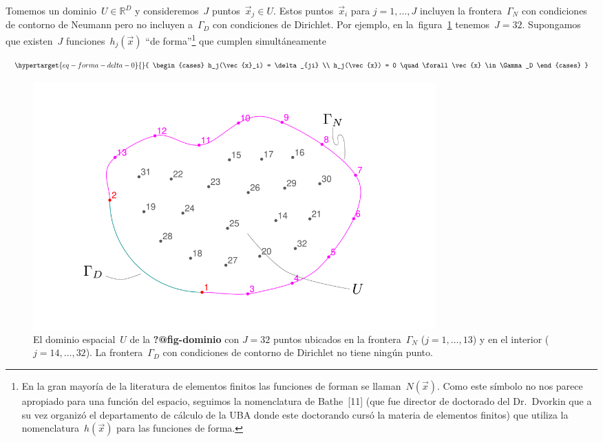 \documentclass[
  12pt,
  a4paper,
  table]{scrbook}
\theoremstyle{plain}
\theoremstyle{definition}
\theoremstyle{plain}
\theoremstyle{plain}
\theoremstyle{remark}
\begin{document}
Tomemos un dominio~\(U\in \mathbb{R}^D\) y consideremos~\(J\)
puntos~\(\vec{x}_j \in U\). Estos puntos~\(\vec{x}_i\) para
\(j=1,\dots,J\) incluyen la frontera~\(\Gamma_N\) con condiciones de
contorno de Neumann pero no incluyen a~\(\Gamma_D\) con condiciones de
Dirichlet. Por ejemplo, en la~figura~\ref{fig-dominio-solo-nodos}
tenemos~\(J=32\). Supongamos que existen~\(J\)
funciones~\(h_j(\vec{x})\) ``de forma''\footnote{En la gran mayoría de
  la literatura de elementos finitos las funciones de forman se
  llaman~\(N(\vec{x})\). Como este símbolo no nos parece apropiado para
  una función del espacio, seguimos la nomenclatura de Bathe~{[}11{]}
  (que fue director de doctorado del Dr.~Dvorkin que a su vez organizó
  el departamento de cálculo de la UBA donde este doctorando cursó la
  materia de elementos finitos) que utiliza la
  nomenclatura~\(h(\vec{x})\) para las funciones de forma.} que cumplen
simultáneamente

\begin{equation}\protect\hypertarget{eq-forma-delta-0}{}{
\begin{cases}
h_j(\vec{x}_i) = \delta_{ji} \\
h_j(\vec{x}) = 0 \quad \forall \vec{x} \in \Gamma_D
\end{cases}
}\label{eq-forma-delta-0}\end{equation}

\begin{figure}

{\centering \includegraphics[width=0.75\textwidth,height=\textheight]{040-discretizacion/dominio-solo-nodos.pdf}

}

\caption{\label{fig-dominio-solo-nodos}El dominio espacial~\(U\) de la
\textbf{?@fig-dominio} con \(J=32\) puntos ubicados en la
frontera~\(\Gamma_N\) (\(j=1,\dots,13\)) y en el interior
(\(j=14,\dots,32\)). La frontera~\(\Gamma_D\) con condiciones de
contorno de Dirichlet no tiene ningún punto.}

\end{figure}
\end{document}

